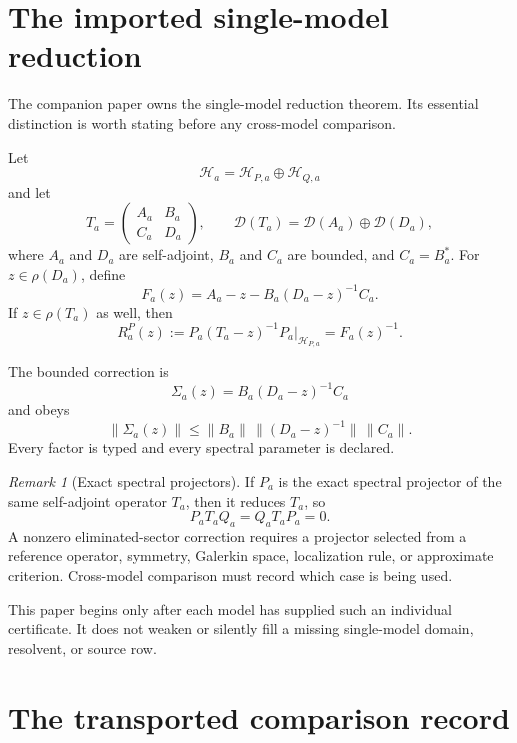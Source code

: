 \documentclass[11pt]{article}
\theoremstyle{definition}
\theoremstyle{remark}
\newtheorem{remark}[theorem]{Remark}
\newcommand{\cD}{\mathcal D}
\newcommand{\cH}{\mathcal H}
\newcommand{\1}{\mathbf 1}
\begin{document}
\section{The imported single-model reduction}
\label{sec:imported}

The companion paper
\cite{MTTCoherentReduction2026} owns the single-model reduction theorem.
Its essential distinction is worth stating before any cross-model
comparison.

Let
\[
  \cH_a=\cH_{P,a}\oplus\cH_{Q,a}
\]
and let
\[
 T_a=
 \begin{pmatrix}
 A_a&B_a\\ C_a&D_a
 \end{pmatrix},
 \qquad
 \cD(T_a)=\cD(A_a)\oplus\cD(D_a),
\]
where \(A_a\) and \(D_a\) are self-adjoint, \(B_a\) and \(C_a\) are
bounded, and \(C_a=B_a^*\).  For
\(z\in\rho(D_a)\), define
\[
 F_a(z)=A_a-z-B_a(D_a-z)^{-1}C_a.
\]
If \(z\in\rho(T_a)\) as well, then
\[
 R_a^P(z)
 :=
 P_a(T_a-z)^{-1}P_a\big|_{\cH_{P,a}}
 =
 F_a(z)^{-1}.
\]

The bounded correction is
\[
 \Sigma_a(z)=B_a(D_a-z)^{-1}C_a
\]
and obeys
\[
 \|\Sigma_a(z)\|
 \leq
 \|B_a\|\,\|(D_a-z)^{-1}\|\,\|C_a\|.
\]
Every factor is typed and every spectral parameter is declared.

\begin{remark}[Exact spectral projectors]
If \(P_a\) is the exact spectral projector of the same self-adjoint
operator \(T_a\), then it reduces \(T_a\), so
\[
 P_aT_aQ_a=Q_aT_aP_a=0.
\]
A nonzero eliminated-sector correction requires a projector selected from
a reference operator, symmetry, Galerkin space, localization rule, or
approximate criterion.  Cross-model comparison must record which case is
being used.
\end{remark}

This paper begins only after each model has supplied such an individual
certificate.  It does not weaken or silently fill a missing single-model
domain, resolvent, or source row.

\section{The transported comparison record}
\label{sec:record}
\end{document}

